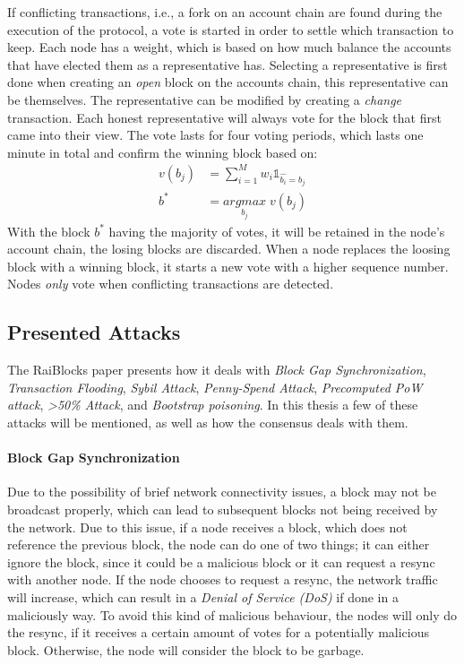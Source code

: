 If conflicting transactions, i.e., a fork on an account chain are found during the execution of the protocol, a vote is started in order to settle which transaction to keep. Each node has a weight, which is based on how much balance the accounts that have elected them as a representative has. Selecting a representative is first done when creating an \emph{open} block on the accounts chain, this representative can be themselves. The representative can be modified by creating a \emph{change} transaction. Each honest representative will always vote for the block that first came into their view.
The vote lasts for four voting periods, which lasts one minute in total and confirm the winning block based on:
\begin{align*}
    v(b_j) &= \sum_{i=1}^M w_i \mathbb{1}_{\hat{b_i} = b_j}\\
    b^* &= \underset{b_j}{arg max} \; v(b_j)
\end{align*}
With the block $b^*$ having the majority of votes, it will be retained in the node's account chain, the losing blocks are discarded. When a node replaces the loosing block with a winning block, it starts a new vote with a higher sequence number. Nodes \emph{only} vote when conflicting transactions are detected.

\subsection{Presented Attacks}
The RaiBlocks paper \cite{raiblocks} presents how it deals with \emph{Block Gap Synchronization}, \emph{Transaction Flooding}, \emph{Sybil Attack}, \emph{Penny-Spend Attack}, \emph{Precomputed PoW attack}, \emph{>50\% Attack}, and \emph{Bootstrap poisoning}. In this thesis a few of these attacks will be mentioned, as well as how the consensus deals with them.

\paragraph{Block Gap Synchronization}
Due to the possibility of brief network connectivity issues, a block may not be broadcast properly, which can lead to subsequent blocks not being received by the network. Due to this issue, if a node receives a block, which does not reference the previous block, the node can do one of two things; it can either ignore the block, since it could be a malicious block or it can request a resync with another node. If the node chooses to request a resync, the network traffic will increase, which can result in a \emph{Denial of Service (DoS)} if done in a maliciously way. To avoid this kind of malicious behaviour, the nodes will only do the resync, if it receives a certain amount of votes for a potentially malicious block. Otherwise, the node will consider the block to be garbage. 


